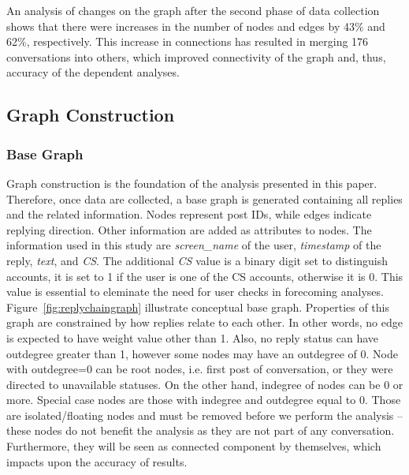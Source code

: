 \documentclass[sigconf]{acmart}
\begin{document}
An analysis of changes on the graph after the second phase of data
collection shows that there were increases in the number of nodes and
edges by 43\% and 62\%, respectively. This increase in connections has
resulted in merging 176 conversations into others, which improved
connectivity of the graph and, thus, accuracy of the dependent
analyses.



\subsection{Graph Construction}

\subsubsection{Base Graph}

Graph construction is the foundation of the analysis presented in this
paper. Therefore, once data are collected, a base graph is generated 
containing all replies and the related information. Nodes represent post IDs, 
while edges indicate replying direction. Other information  
are added as attributes to nodes. The information used in this study 
are {\emph{screen\_name}} of the user, {\emph{timestamp}} of the 
reply, {\emph{text}}, and {\emph{CS}}. The additional {\emph{CS}} 
value is a binary digit set to distinguish accounts, it is set to 1 if the user is one of the CS 
accounts, otherwise it is 0. This value is essential to eleminate the need for user 
checks in forecoming analyses. Figure~\ref{fig:replychaingraph} illustrate conceptual 
base graph. Properties of this graph are
constrained by how replies relate to each other. In other words, no
edge is expected to have weight value other than 1. Also, no reply
status can have outdegree greater than 1, however some nodes may have
an outdegree of 0. Node with outdegree=0 can be root nodes, i.e. first
post of conversation, or they were directed to unavailable
statuses. On the other hand, indegree of nodes can be 0 or
more. Special case nodes are those with indegree and outdegree equal
to 0. Those are isolated/floating nodes and must be removed before we
perform the analysis -- these nodes do not benefit the analysis as
they are not part of any conversation. Furthermore, they will be seen
as connected component by themselves, which impacts upon the accuracy
of results.
\end{document}
